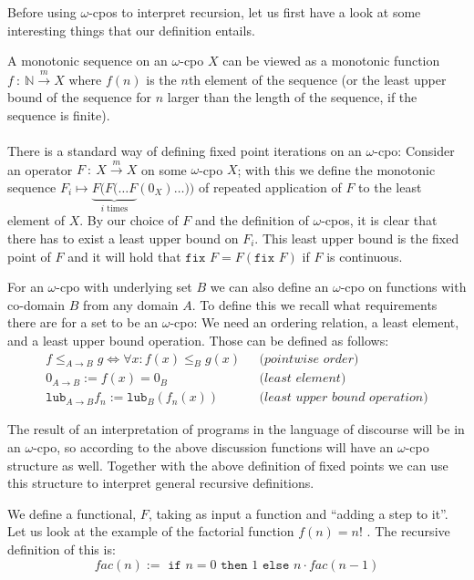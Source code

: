 \documentclass[11pt, leqno, titlepage]{article}
\theoremstyle{definition}
\begin{document}
Before using $\omega$-cpos to interpret recursion, let us first have a look at some
interesting things that our definition entails.

A monotonic sequence on an $\omega$-cpo $X$ can be viewed as a monotonic function
$f~:~\mathbb{N} \xrightarrow{m} X$ where $f(n)$ is the $n$th element of the sequence (or the
least upper bound of the sequence for $n$ larger than the length of the sequence, if the sequence is finite).\\
\\
There is a standard way of defining fixed point iterations on an
$\omega$-cpo\cite{rml-paper}: Consider an operator $F~:~X \xrightarrow{m} X$ on some
$\omega$-cpo $X$; with this we define the monotonic sequence $F_i \mapsto
\underbrace{ F(F(\dots F}_{i \text{ times}} (0_X) \dots))$ of repeated application of
$F$ to the least element of $X$.  By our choice of $F$ and the definition of
$\omega$-cpos, it is clear that there has to exist a least upper bound on $F_i$. This
least upper bound is the fixed point of $F$ and it will hold that $\texttt{fix } F =
F(\texttt{fix }F)$ if $F$ is continuous.

For an $\omega$-cpo with underlying set $B$ we can also define an $\omega$-cpo on
functions with co-domain $B$ from any domain $A$.  To define this we recall what
requirements there are for a set to be an $\omega$-cpo: We need an ordering relation,
a least element, and a least upper bound operation. Those can be defined as follows:
\begin{align*}
  f\leq_{A \to B} g \Leftrightarrow \forall x: f(x) \leq_B g(x) & ~~~\textit{(pointwise order)}\\
  0_{A\to B} := f(x) = 0_B & ~~~\textit{(least element)}\\
  \texttt{lub}_{A\to B} f_n := \texttt{lub}_B(f_n(x)) & ~~~\textit{(least upper
                                                               bound operation)}
\end{align*}


The result of an interpretation of programs in the language of discourse will be in
an $\omega$-cpo, so according to the above discussion functions will have an
$\omega$-cpo structure as well. Together with the above definition of fixed points we
can use this structure to interpret general recursive definitions. 

We define a functional, $F$, taking as input a function and ``adding a step to it''.
Let us look at the example of the factorial function $f(n) = n!$ \cite{haskell}.
The recursive definition of this is:
$$fac(n) := \texttt{ if } n = 0 \texttt{ then }1\texttt{ else } n\cdot fac(n-1)$$
\end{document}
